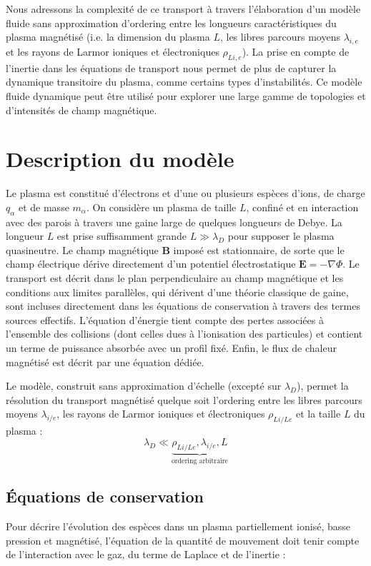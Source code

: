 \begin{refsection}
Nous adressons la complexité de ce transport à travers l’élaboration d'un modèle
fluide sans approximation d'ordering entre les longueurs caractéristiques du
plasma magnétisé (i.e. la dimension du plasma $L$, les libres parcours moyens
$\lambda_{i,e}$ et les rayons de Larmor ioniques et électroniques $\rho_{Li,e}$). 
La prise en compte de l'inertie	dans les équations de transport nous permet de
plus de capturer la dynamique transitoire du plasma, comme certains types
d'instabilités. Ce modèle fluide dynamique peut être utilisé pour explorer
une large gamme de topologies et d'intensités de champ magnétique.

\section{Description du modèle}
Le plasma est constitué d'électrons et d'une ou plusieurs espèces d'ions, de
charge $q_\alpha$ et de masse $m_\alpha$. On considère un plasma de taille $L$,
confiné et en interaction avec des parois à travers une gaine large de quelques longueurs
de Debye. La longueur $L$ est prise suffisamment grande $L\gg\lambda_D$ pour
supposer le plasma quasineutre. Le champ magnétique $\mathbf{B}$ imposé est 
stationnaire, de sorte que le champ électrique dérive directement d'un 
potentiel électrostatique $\mathbf{E}=-\nabla \Phi$. Le transport est décrit
dans le plan perpendiculaire au champ magnétique et les conditions aux limites
parallèles, qui dérivent d'une théorie classique de gaine, sont
incluses directement dans les équations de conservation à travers des termes
sources effectifs. L'équation d'énergie tient compte des pertes
associées à l'ensemble des collisions (dont celles dues à l'ionisation des particules) et
contient un terme de puissance
absorbée avec un profil fixé. Enfin, le flux de chaleur magnétisé
est décrit par une équation dédiée.

Le modèle, construit sans approximation d'échelle (excepté sur $\lambda_D$),
permet la résolution du transport magnétisé quelque soit l'ordering entre les
libres parcours moyens $\lambda_{{i/e}}$, les rayons de Larmor ioniques et
électroniques $\rho_{L{i/Le}}$ et la taille $L$ du plasma :
\begin{equation}
\lambda_D\ll\underbrace{\rho_{L{i/Le}},\lambda_{{i/e}},L}_\text{ordering
arbitraire}
\end{equation}

\subsection{Équations de conservation}
Pour décrire l'évolution des espèces dans un plasma partiellement ionisé, basse
pression et magnétisé, l'équation de la quantité de mouvement doit tenir compte
de l'interaction avec le gaz, du terme de Laplace et de l'inertie :


\end{refsection}
